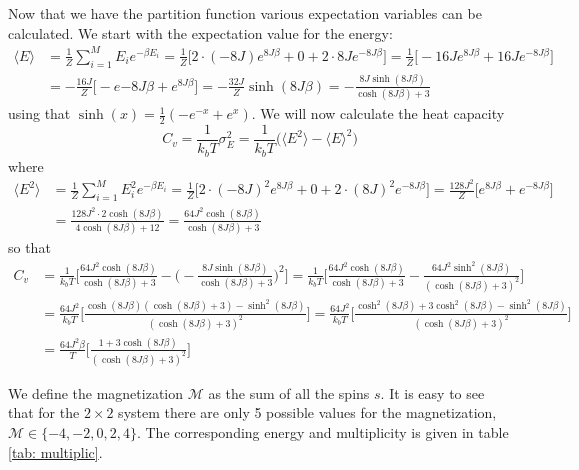 \documentclass[11pt,a4wide]{article}
\begin{document}
Now that we have the partition function various expectation variables can be calculated. We start with the expectation value for the energy:
\begin{align*}
\langle E \rangle &= \frac{1}{Z} \sum_{i=1}^M E_ie^{-\beta E_i} = \frac{1}{Z} \big[ 2\cdot (-8J)e^{8J\beta} + 0 + 2\cdot 8Je^{-8J\beta}\big] = \frac{1}{Z} \big[-16Je^{8J\beta} + 16Je^{-8J\beta}\big] \\
&= -\frac{16J}{Z}\big[-e{-8J\beta} + e^{8J\beta}\big] = -\frac{32J}{Z}\sinh(8J\beta) = -\frac{8J\sinh(8J\beta)}{\cosh(8J\beta) + 3}
\end{align*}
using that $\sinh(x) = \frac{1}{2}(-e^{-x} + e^x)$. We will now calculate the heat capacity 
\[
C_v = \frac{1}{k_bT}\sigma_E^2 =  \frac{1}{k_bT}\big(\langle E^2 \rangle - \langle E \rangle^2\big)
\]
where
\begin{align*}
\langle E^2 \rangle &= \frac{1}{Z} \sum_{i=1}^M E_i^2 e^{-\beta E_i} = \frac{1}{Z} \big[ 2\cdot (-8J)^2 e^{8J\beta} + 0 + 2\cdot (8J)^2 e^{-8J\beta}\big] = \frac{128J^2}{Z} \big[ e^{8J\beta} + e^{-8J\beta}\big] \\
&= \frac{128J^2 \cdot 2\cosh(8J\beta)}{4\cosh(8J\beta) + 12} =  \frac{64J^2 \cosh(8J\beta)}{\cosh(8J\beta) + 3}
\end{align*}
so that 
\begin{align*}
C_v &= \frac{1}{k_bT}\bigg[ \frac{64J^2 \cosh(8J\beta)}{\cosh(8J\beta) + 3} - \bigg(  -\frac{8J\sinh(8J\beta)}{\cosh(8J\beta) + 3} \bigg)^2 \bigg] = \frac{1}{k_bT}\bigg[ \frac{64J^2 \cosh(8J\beta)}{\cosh(8J\beta) + 3} - \frac{64J^2 \sinh^2(8J\beta)}{(\cosh(8J\beta) + 3)^2} \bigg] \\
&= \frac{64J^2}{k_bT}\bigg[ \frac{ \cosh(8J\beta)(\cosh(8J\beta) + 3)-  \sinh^2(8J\beta)}{(\cosh(8J\beta) + 3)^2} \bigg] = \frac{64J^2}{k_bT}\bigg[ \frac{\cosh^2(8J\beta) + 3\cosh^2(8J\beta) - \sinh^2(8J\beta)}{(\cosh(8J\beta) + 3)^2} \bigg] \\
&= \frac{64J^2\beta}{T} \bigg[\frac{1 + 3\cosh(8J\beta)}{(\cosh(8J\beta) + 3)^2} \bigg]
\end{align*}

We define the magnetization $\mathcal{M}$ as the sum of all the spins $s$. It is easy to see that for the $2\times 2$ system there are only 5 possible values for the magnetization, $\mathcal{M} \in \{-4, -2, 0, 2, 4\}$.  The corresponding energy and multiplicity is given in table \ref{tab: multiplic}. 
\end{document}
